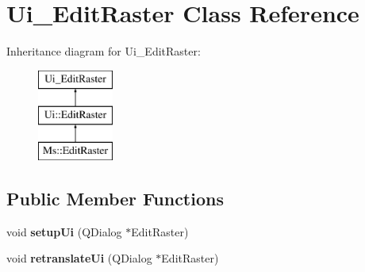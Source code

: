 \hypertarget{class_ui___edit_raster}{}\section{Ui\+\_\+\+Edit\+Raster Class Reference}
\label{class_ui___edit_raster}
Inheritance diagram for Ui\+\_\+\+Edit\+Raster\+:\begin{figure}[H]
\begin{center}
\leavevmode
\includegraphics[height=3.000000cm]{class_ui___edit_raster}
\end{center}
\end{figure}
\subsection*{Public Member Functions}
\begin{DoxyCompactItemize}
\item 
\mbox{\label{class_ui___edit_raster_ac2102e361a115753d214bb0de792ee71}} 
void {\bfseries setup\+Ui} (Q\+Dialog $\ast$Edit\+Raster)
\item 
\mbox{\label{class_ui___edit_raster_a718a69a55fbdff4b40c96dfe1ac4391e}} 
void {\bfseries retranslate\+Ui} (Q\+Dialog $\ast$Edit\+Raster)
\end{DoxyCompactItemize}
